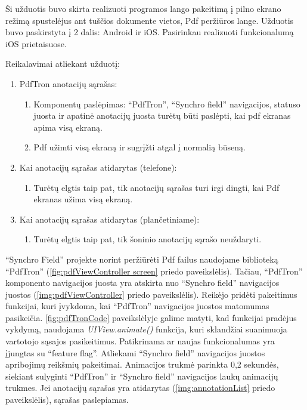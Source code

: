 Ši užduotis buvo skirta realizuoti programos lango pakeitimą į pilno ekrano režimą spustelėjus ant tuščios dokumente vietos, Pdf peržiūros lange. Užduotis buvo paskirstyta į 2 dalis: Android ir iOS. Pasirinkau realizuoti funkcionalumą iOS prietaisuose.

Reikalavimai atliekant užduotį:

\begin{enumerate}
    \item PdfTron anotacijų sąrašas:
    \begin{enumerate}
        \item Komponentų paslėpimas: \enquote{PdfTron}, \enquote{Synchro field} navigacijos, statuso juosta ir apatinė anotacijų juosta turėtų būti paslėpti, kai pdf ekranas apima visą ekraną.
        \item Pdf užimti visą ekraną ir sugrįžti atgal į normalią būseną.
    \end{enumerate}
    \item Kai anotacijų sąrašas atidarytas (telefone):
    \begin{enumerate}
        \item Turėtų elgtis taip pat, tik anotacijų sąrašas turi irgi dingti, kai Pdf ekranas užima visą ekraną.
    \end{enumerate}
    \item Kai anotacijų sąrašas atidarytas (plančetiniame):
    \begin{enumerate}
        \item Turėtų elgtis taip pat, tik šoninio anotacijų sąrašo neuždaryti.
    \end{enumerate}
\end{enumerate}


\enquote{Synchro Field} projekte norint peržiūrėti Pdf failus naudojame biblioteką \enquote{PdfTron} (\ref{fig:pdfViewController screen} priedo paveikslėlis). Tačiau, \enquote{PdfTron} komponento navigacijos juosta yra atskirta nuo \enquote{Synchro field} navigacijos juostos (\ref{img:pdfViewController} priedo paveikslėlis). Reikėjo pridėti pakeitimus funkcijai, kuri įvykdoma, kai \enquote{PdfTron} navigacijos juostos matomumas pasikeičia. \ref{fig:pdfTronCode} paveikslėlyje galime matyti, kad funkcijai pradėjus vykdymą, naudojama \textit{UIView.animate()} funkcija, kuri sklandžiai suanimuoja vartotojo sąsajos pasikeitimus. Patikrinama ar naujas funkcionalumas yra įjungtas su \enquote{feature flag}. Atliekami \enquote{Synchro field} navigacijos juostos apribojimų reikšmių pakeitimai. Animacijos trukmė parinkta 0,2 sekundės, siekiant sulyginti \enquote{PdfTron} ir \enquote{Synchro field} navigacijos laukų animacijų trukmes. Jei anotacijų sąrašas yra atidarytas (\ref{img:annotationList} priedo paveikslėlis), sąrašas paslepiamas.

